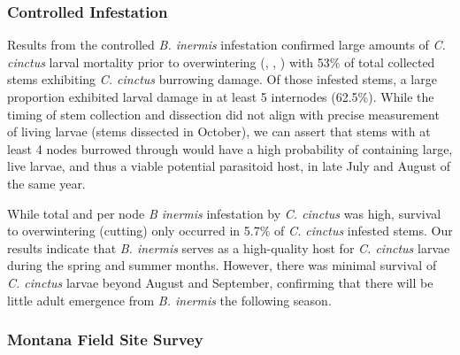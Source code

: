 \documentclass[
]{article}
\begin{document}
\subsubsection{Controlled Infestation}\label{controlled-infestation}

Results from the controlled \emph{B. inermis} infestation confirmed
large amounts of \emph{C. cinctus} larval mortality prior to
overwintering (,
,
) with 53\% of total
collected stems exhibiting \emph{C. cinctus} burrowing damage. Of those
infested stems, a large proportion exhibited larval damage in at least 5
internodes (62.5\%). While the timing of stem collection and dissection
did not align with precise measurement of living larvae (stems dissected
in October), we can assert that stems with at least 4 nodes burrowed
through would have a high probability of containing large, live larvae,
and thus a viable potential parasitoid host, in late July and August of
the same year.

While total and per node \emph{B inermis} infestation by \emph{C.
cinctus} was high, survival to overwintering (cutting) only occurred in
5.7\% of \emph{C. cinctus} infested stems. Our results indicate that
\emph{B. inermis} serves as a high-quality host for \emph{C. cinctus}
larvae during the spring and summer months. However, there was minimal
survival of \emph{C. cinctus} larvae beyond August and September,
confirming that there will be little adult emergence from \emph{B.
inermis} the following season.

\subsubsection{Montana Field Site
Survey}\label{montana-field-site-survey}
\end{document}
